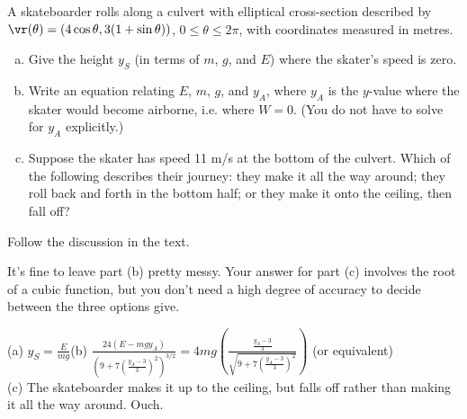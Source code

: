 \begin{question}
A skateboarder rolls along a culvert with elliptical cross-section described by\\ $\vr(\theta)=(4\cos\theta,3(1+\sin\theta))$, $0 \le \theta \le 2\pi$, with coordinates measured in metres.

\begin{enumerate}[(a)]
	\item Give the height $y_S$ (in terms of $m$, $g$, and $E$) where the skater's speed is zero.
	\item Write an equation relating $E$, $m$, $g$, and $y_A$, where $y_A$ is the $y$-value where the skater would become airborne, i.e. where $W=0$. (You do not have to solve for $y_A$ explicitly.)
	\item Suppose the skater has speed 11 m/s at the bottom of the culvert.
	Which of the following describes their journey: they make it all the way around; they roll back and forth in the bottom half; or they make it onto the ceiling, then fall off?
	\end{enumerate}
\end{question}
\begin{hint}
	Follow the discussion in the text.
	
	It's fine to leave part (b) pretty messy. Your answer for part (c) involves the root of a cubic function, but you don't need a high degree of accuracy to decide between the three options give.
\end{hint}
\begin{answer}
(a) $y_S=\frac{E}{mg}$\qquad (b) $\frac{24\left(E-mgy_A\right)}{\left(9+7\left( \frac{y_A-3}{3}\right)^2 \right)^{3/2}} =4mg\left(\frac{ \frac{y_A-3}{3}}{\sqrt{9+7\left( \frac{y_A-3}{3}\right)^2}} \right) $ (or equivalent)\\
(c) The skateboarder makes it up to the ceiling, but falls off rather than making it all the way around. Ouch.
\end{answer}

